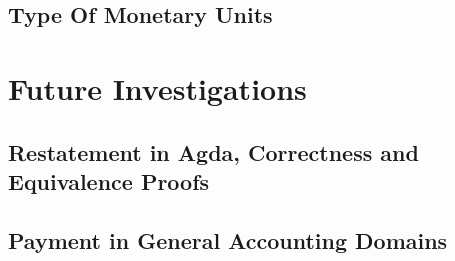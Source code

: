 \section{Type Of Monetary Units}

\chapter{Future Investigations}

\section{Restatement in Agda, Correctness and Equivalence Proofs}

\section{Payment in General Accounting Domains}

\newpage
\printbibliography{}


